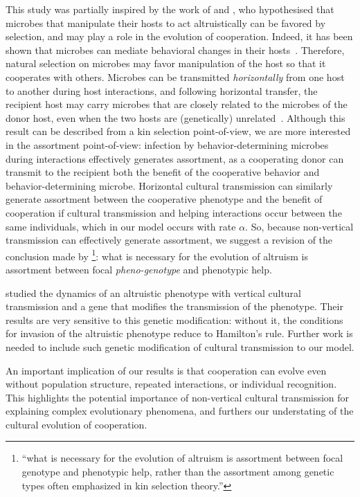 \documentclass[12pt]{extarticle}
\begin{document}
{This study was partially inspired by the work of \citet{lewin2017microbes} and \citet{lewin2020rockpaperscissors}, 
who hypothesised that microbes that manipulate their hosts to act altruistically can be favored by selection, and may play a role in the evolution of cooperation. Indeed, it has been shown that microbes can mediate behavioral changes in their hosts~\citep{dobson1988population,poulin2010parasite}. 
Therefore, natural selection on microbes may favor manipulation of the host so that it cooperates with others. Microbes can be transmitted \emph{horizontally} from one host to another during host interactions, and following horizontal transfer, the recipient host may carry microbes that are closely related to the microbes of the donor host, 
even when the two hosts are (genetically) unrelated~\citep{lewin2017microbes}. 
Although this result can be described from a kin selection point-of-view, we are more interested in the assortment point-of-view:
infection by behavior-determining microbes during interactions effectively generates assortment, as a cooperating donor can transmit to the recipient both the benefit of the cooperative behavior and behavior-determining microbe.
Horizontal cultural transmission can similarly generate assortment between the cooperative phenotype and the benefit of cooperation if cultural transmission and helping interactions occur between the same individuals, which in our model occurs with rate $\alpha$. 
So, because non-vertical transmission can effectively generate assortment, we suggest a revision of the conclusion made by \citet{Fletcher2009assortment}\footnote{``what is necessary for the evolution of altruism is assortment between focal genotype and phenotypic help, rather than the assortment among genetic types often emphasized in kin selection theory.''}: what is necessary for the evolution of altruism is assortment between focal \emph{pheno-genotype} and phenotypic help.

\citet{feldman1985gene} studied the dynamics of an altruistic phenotype with vertical cultural transmission and a gene that modifies the transmission of the phenotype. Their results are very sensitive to this genetic modification: without it, the conditions for invasion of the altruistic phenotype reduce to Hamilton's rule.
Further work is needed to include such genetic modification of cultural transmission to our model.

An important implication of our results is that cooperation can evolve even without population structure, repeated interactions, or individual recognition.
This highlights the potential importance of non-vertical cultural transmission for explaining complex evolutionary phenomena, and  furthers our understating of the cultural evolution of cooperation. 

}
\end{document}

